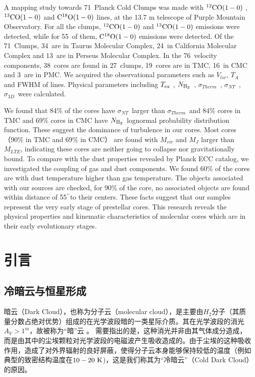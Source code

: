 \documentclass[UTF8, nocolorlinks]{pkuthss}
\newcommand{\coaa}{$\rm^{12}CO(1-0)$ }
\newcommand{\cobb}{$\rm^{13}CO(1-0)$ }
\newcommand{\cocc}{$\rm C^{18}O(1-0)$ }
\newcommand{\texc}{$T_{\rm {ex}}$ }
\newcommand{\nhyd}{$N_{\rm H_2}$\ }
\newcommand{\sigmath}{$\sigma _{Therm}$\ }
\newcommand{\sigmant}{$\sigma _{NT}$\ }
\newcommand{\sigmatd}{$\sigma _{3D}$\ }
\newcommand{\arcsec}{$^{\prime\prime}$}
\newcommand{\numsou}{71\ }
\newcommand{\numsoutmc}{34\ }
\newcommand{\numsoupmc}{13\ }
\newcommand{\numsoucmc}{24\ }
\newcommand{\numcore}{38\ }
\newcommand{\numcoretmc}{19\ }
\newcommand{\numcorepmc}{3\ }
\newcommand{\numcorecmc}{16\ }
\newcommand{\numcocc}{55\ }
\newcommand{\numcompofcores}{27\ }
\newcommand{\numvelcomp}{76\ }
\begin{document}
\begin{eabstract}

	A mapping study towards \numsou Planck Cold Clumps was made with \coaa, \cobb and \cocc lines, at the 13.7 m telescope of Purple Mountain Observatory. For all the clumps, \coaa and \cobb emissions were detected, while for \numcocc of them, \cocc emissions were detected.  Of the \numsou Clumps, \numsoutmc are in Taurus Molecular Complex, \numsoucmc in California  Molecular Complex and \numsoupmc are in Perseus Molecular Complex. In the \numvelcomp velocity components, \numcore cores are found in \numcompofcores clumps, \numcoretmc cores are in TMC, \numcorecmc in CMC and \numcorepmc are in PMC.
    We acquired the observational parameters such as $V_{lsr}$, $T_{A}$ and FWHM of lines. Physical parameters including \texc, \nhyd, \sigmath, \sigmant,  \sigmatd were calculated.

    We found that 84\% of the cores have \sigmant larger than \sigmath and 84\% cores in TMC and 69\% cores in CMC have \nhyd lognormal probability distribution function. These suggest the dominance of turbulence in our cores. Most cores （90\% in TMC and 69\% in CMC） are found with $M_{vir}$ and $M_J$ larger than $M_{LTE}$, indicating these cores are neither going to collapse nor gravitationally bound. To compare with the dust properties revealed by Planck ECC catalog, we investigated the coupling of gas and dust components. We found 60\% of the cores are with dust temperature higher than gas temperature. The objects associated with our sources are checked, for 90\% of the core, no associated objects are found within distance of 55\arcsec to their centers. These facts suggest that our samples represent the very early stage of prestellar cores. This research reveals the physical properties and kinematic characteristics of molecular cores which are in their early evolutionary stages.
\end{eabstract}

	\tableofcontents
	\mainmatter

\chapter{引言}
	\section{冷暗云与恒星形成}\label{Sec.ColdDarkCloud}

		暗云（Dark Cloud），也称为分子云（molecular cloud），是主要由$H_2$分子（其质量分数占绝对优势）组成的在光学波段暗的一类星际介质。其在光学波段的消光$A_V>1^{m}$，故被称为“暗”云\supercite{2007ARA&A..45..339B} 。 需要指出的是，这种消光并非由其气体成分造成，而是由其中的尘埃颗粒对光学波段的电磁波产生吸收造成的。由于尘埃的这种吸收作用，造成了对外界辐射的良好屏蔽，使得分子云本身能够保持较低的温度（例如典型的致密结构温度在$10-20\rm\ K$\supercite{1983ApJ...265..223B})，这是我们称其为“冷暗云”（Cold Dark Cloud）的原因。
\end{document}
